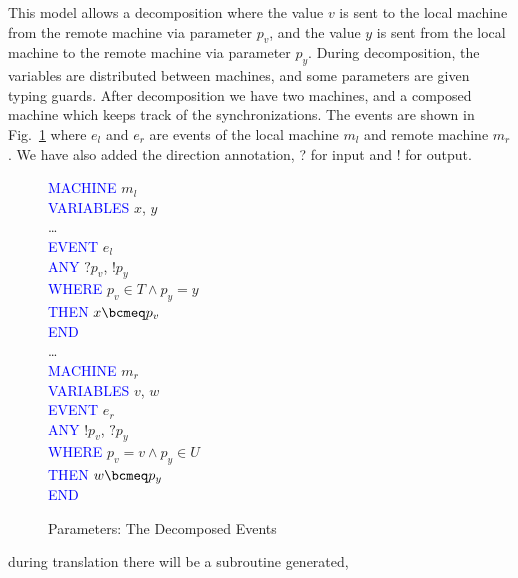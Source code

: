 %
This model allows a decomposition where the value $v$ is sent to the local machine from the remote machine via parameter $p_v$, and the value $y$ is sent from the local machine to the remote machine via parameter $p_y$. During decomposition, the variables are distributed between machines, and some parameters are given typing guards. After decomposition we have two machines, and a composed machine which keeps track of the synchronizations. The events are shown in Fig.~\ref{fig:dec} where $e_l$ and $e_r$ are events of the local machine $m_l$ and remote machine $m_r$. We have also added the direction annotation, ? for input and ! for output.
%
\begin{figure}
\centering
\begin{minipage}{0.4\textwidth}
\textcolor{blue}{MACHINE} $m_l$\\
\textcolor{blue}{VARIABLES} $x$, $y$\\
\ldots\\
\textcolor{blue}{EVENT} $e_l$ \\
\hspace*{0.2cm}\textcolor{blue}{ANY} $?p_v$, $!p_y$ \\
\hspace*{0.2cm}\textcolor{blue}{WHERE} $p_v \in T \land p_y = y$\\
\hspace*{0.2cm}\textcolor{blue}{THEN} $x \bcmeq p_v$\\
\textcolor{blue}{END}\\
\ldots\\
\textcolor{blue}{MACHINE} $m_r$\\
\textcolor{blue}{VARIABLES} $v$, $w$\\
\textcolor{blue}{EVENT} $e_r$ \\
\hspace*{0.2cm}\textcolor{blue}{ANY} $!p_v$, $?p_y$ \\
\hspace*{0.2cm}\textcolor{blue}{WHERE} $p_v = v \land p_y \in U$\\
\hspace*{0.2cm}\textcolor{blue}{THEN} $w \bcmeq p_y$\\
\textcolor{blue}{END}
\end{minipage}
\caption{Parameters: The Decomposed Events}
\label{fig:dec}
\end{figure}
%
during translation there will be a subroutine generated,
%
